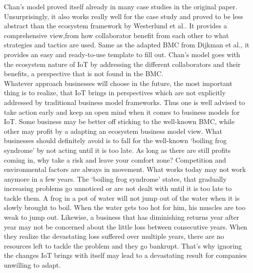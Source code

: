 		Chan's model proved itself already in many case studies in the original paper. Unsurprisingly, it also works really well for the case study and proved to be less abstract than the ecosystem framework by Westerlund et al.. It provides a comprehensive view,from how collaborator benefit from each other to what strategies and tactics are used. Same as the adapted BMC from Dijkman et al., it provides an easy and ready-to-use template to fill out. Chan's model goes with the ecosystem nature of IoT by addressing the different collaborators and their benefits, a perspective that is not found in the BMC.\\
		Whatever approach businesses will choose in the future, the most important thing is to realize, that IoT brings in perspectives which are not explicitly addressed by traditional business model frameworks. Thus one is well advised to take action early and keep an open mind when it comes to business models for IoT. Some business may be better off sticking to the well-known BMC, while other may profit by a adapting an ecosystem business model view. What businesses should definitely avoid is to fall for the well-known `boiling frog syndrome' by not acting until it is too late. As long as there are still profits coming in, why take a risk and leave your comfort zone? Competition and environmental factors are always in movement. What works today may not work anymore in a few years. The `boiling frog syndrome' states, that gradually increasing problems go unnoticed or are not dealt with until it is too late to tackle them. A frog in a pot of water will not jump out of the water when it is slowly brought to boil. When the water gets too hot for him, his muscles are too weak to jump out. Likewise, a business that has diminishing returns year after year may not be concerned about the little loss between consecutive years. When they realize the devastating loss suffered over multiple years, there are no resources left to tackle the problem and they go bankrupt. That's why ignoring the changes IoT brings with itself may lead to a devastating result for companies unwilling to adapt.
\vspace{-2em}
